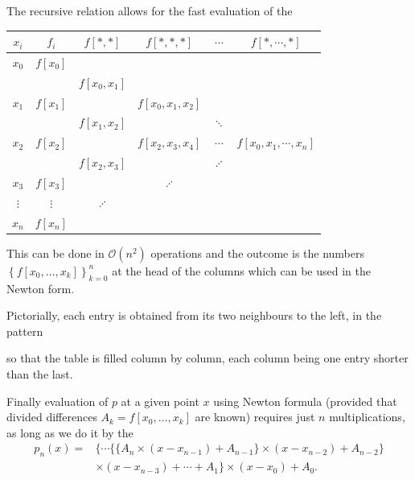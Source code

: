 The recursive relation allows for the fast evaluation of the 
\begin{center}
  \begin{tabular}{cccccc}
    \toprule
    $x_i$ & $f_i$ & $f[*, *]$ & $f[*, *, *]$ & $\cdots$ & $f[*, \cdots,*]$\\
    \midrule
    $x_0$ & $f[x_0]$\\
    & & $f[x_0, x_1]$\\
    $x_1$ & $f[x_1]$ & & $f[x_0, x_1, x_2]$ \\
    & & $f[x_1, x_2]$ & & $\ddots$\\
    $x_2$ & $f[x_2]$ & & $f[x_2, x_3, x_4]$ & $\cdots$ & $f[x_0, x_1, \cdots, x_n]$\\
    & & $f[x_2, x_3]$ & & $\iddots$\\
    $x_3$ & $f[x_3]$ & & $\iddots$\\
    $\vdots$ & $\vdots$ & $\iddots$ &\\
    $x_n$ & $f[x_n]$\\
    \bottomrule
  \end{tabular}
\end{center}
This can be done in $\mathcal{O}\left(n^{2}\right)$ operations and the outcome is the numbers $\left\{f\left[x_{0}, \ldots, x_{k}\right]\right\}_{k=0}^{n}$ at the head of the columns which can be used in the Newton form.

Pictorially, each entry is obtained from its two neighbours to the left, in the pattern
\begin{center}
\end{center}
so that the table is filled column by column, each column being one entry shorter than the last.

Finally evaluation of $p$ at a given point $x$ using Newton formula (provided that divided differences $A_k = f[x_0, \dots, x_k]$ are known) requires just $n$ multiplications, as long as we do it by the 
\begin{align*}
p_{n}(x)=&\{\cdots\{\{A_{n} \times(x-x_{n-1})+A_{n-1}\} \times(x-x_{n-2})+A_{n-2}\} \\
& \times(x-x_{n-3})+\cdots+A_{1}\} \times(x-x_{0})+A_{0} .
\end{align*}


